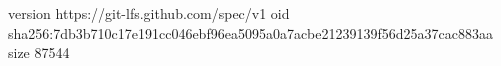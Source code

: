 version https://git-lfs.github.com/spec/v1
oid sha256:7db3b710c17e191cc046ebf96ea5095a0a7acbe21239139f56d25a37cac883aa
size 87544
